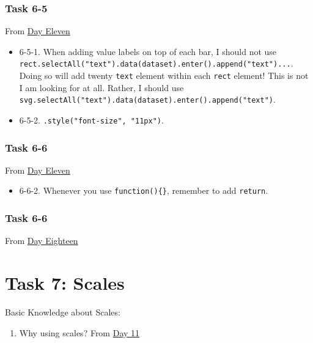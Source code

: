 \documentclass[
]{book}
\providecommand{\tightlist}{%
  \setlength{\itemsep}{0pt}\setlength{\parskip}{0pt}}
\begin{document}
\hypertarget{task-6-5}{%
\subsection{Task 6-5}\label{task-6-5}}

From \href{https://observablehq.com/@hongtaoh/day-eleven-sept-4th-2020}{Day Eleven}

\begin{itemize}
\item
  6-5-1. When adding value labels on top of each bar, I should not use \texttt{rect.selectAll("text").data(dataset).enter().append("text")...}. Doing so will add twenty \texttt{text} element within each \texttt{rect} element! This is not I am looking for at all. Rather, I should use \texttt{svg.selectAll("text").data(dataset).enter().append("text")}.
\item
  6-5-2. \texttt{.style("font-size",\ "11px")}.
\end{itemize}

\hypertarget{task-6-6}{%
\subsection{Task 6-6}\label{task-6-6}}

From \href{https://observablehq.com/@hongtaoh/day-eleven-sept-4th-2020}{Day Eleven}

\begin{itemize}
\tightlist
\item
  6-6-2. Whenever you use \texttt{function()\{\}}, remember to add \texttt{return}.
\end{itemize}

\hypertarget{task-6-6-1}{%
\subsection{Task 6-6}\label{task-6-6-1}}

From \href{https://observablehq.com/@hongtaoh/day-eighteen-sept-11-2020}{Day Eighteen}

\hypertarget{task7}{%
\chapter{Task 7: Scales}\label{task7}}

Basic Knowledge about Scales:

\begin{enumerate}
\def\labelenumi{\arabic{enumi}.}
\tightlist
\item
  Why using scales?
  From \href{https://observablehq.com/@hongtaoh/day-eleven-sept-4th-2020}{Day 11}
\end{enumerate}
\end{document}
